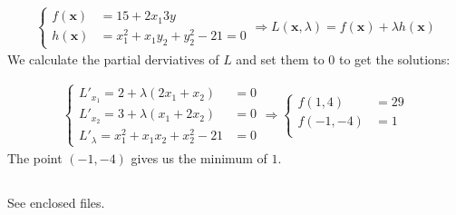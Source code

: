 \documentclass{article}
\begin{document}
\subsubsection{}

\begin{align*}
  \begin{cases}
    f(\mathbf{x}) &= 15 + 2x_1  3y \\
    h(\mathbf{x}) &= x_1^2 + x_1y_2 + y_2^2 - 21 = 0
  \end{cases}
  \Rightarrow
  L(\mathbf{x}, \lambda) = f(\mathbf{x}) + \lambda h(\mathbf{x})
\end{align*}
We calculate the partial derviatives of $L$ and set them to $0$ to get the solutions:

\begin{align*}
  \begin{cases}
    L'_{x_1} = 2 + \lambda (2x_1 + x_2) &= 0 \\
    L'_{x_2} = 3 + \lambda (x_1 + 2x_2) &= 0 \\
    L'_{\lambda} = x_1^2 + x_1 x_2 + x_2^2 - 21 &= 0
  \end{cases}
  \Rightarrow
  \begin{cases}
    f(1, 4) &= 29 \\
    f(-1, -4) &= 1 \\
  \end{cases}
\end{align*}
The point $(-1, -4)$ gives us the minimum of $1$.

\subsection{}
\subsubsection{}

See enclosed files.

\subsubsection{}
\end{document}

